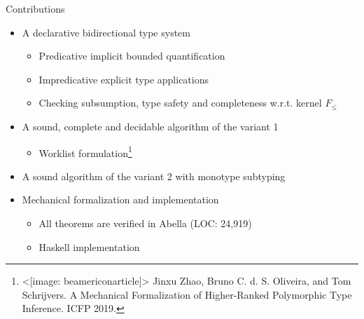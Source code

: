 \documentclass[aspectratio=43,10pt]{beamer}
\newcommand{\pdfnote}[1]{\marginnote{\pdfcomment[icon=note]{#1}}}
\def\texttt#1{<#1>}%
\begin{document}
%
%

\setlength{\leftmargini}{1.5pt}


\begin{frame}[fragile]{Contributions}
    \begin{itemize}
		\item A declarative bidirectional type system
			\begin{itemize}
				\item Predicative implicit bounded quantification
				\item Impredicative explicit type applications
				\item Checking subsumption, type safety and completeness w.r.t. kernel $F_{\le}$
			\end{itemize}
		\item A sound, complete and decidable algorithm of the variant 1	\begin{itemize}
				\item Worklist formulation\footnote{\texttt{[image: beamericonarticle]} Jinxu Zhao, Bruno C. d. S. Oliveira, and Tom Schrijvers. A Mechanical Formalization of Higher-Ranked Polymorphic Type Inference. ICFP 2019.}
			\end{itemize}
		\item A sound algorithm of the variant 2 with monotype subtyping
        \item Mechanical formalization and implementation
              \begin{itemize}
              	\item All theorems are verified in Abella (LOC: 24,919)
              	\item Haskell implementation
              \end{itemize}
    \end{itemize}
\end{frame}
\end{document}
